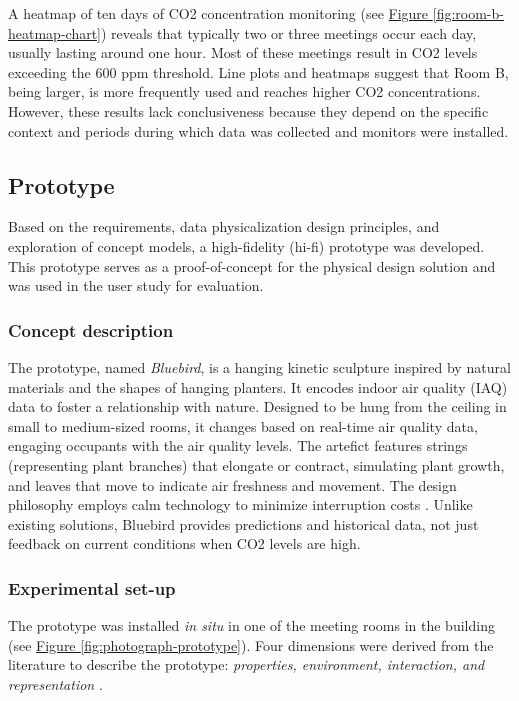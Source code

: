 A heatmap of ten days of CO2 concentration monitoring (see \hyperref[fig:room-b-heatmap-chart]{Figure \ref*{fig:room-b-heatmap-chart}}) reveals that typically two or three meetings occur each day, usually lasting around one hour. Most of these meetings result in CO2 levels exceeding the 600 ppm threshold. Line plots and heatmaps suggest that Room B, being larger, is more frequently used and reaches higher CO2 concentrations. However, these results lack conclusiveness because they depend on the specific context and periods during which data was collected and monitors were installed.


\subsection{Prototype}
\label{sec:prototype_results}

Based on the requirements, data physicalization design principles, and exploration of concept models, a high-fidelity (hi-fi) prototype was developed. This prototype serves as a proof-of-concept for the physical design solution and was used in the user study for evaluation.

\subsubsection{Concept description}

The prototype, named \textit{Bluebird}, is a hanging kinetic sculpture inspired by natural materials and the shapes of hanging planters. It encodes indoor air quality (IAQ) data to foster a relationship with nature. Designed to be hung from the ceiling in small to medium-sized rooms, it changes based on real-time air quality data, engaging occupants with the air quality levels. The artefict features strings (representing plant branches) that elongate or contract, simulating plant growth, and leaves that move to indicate air freshness and movement. The design philosophy employs calm technology to minimize interruption costs \cite{case_calm_2016}. Unlike existing solutions, Bluebird provides predictions and historical data, not just feedback on current conditions when CO2 levels are high.

\subsubsection{Experimental set-up}

The prototype was installed \textit{in situ} in one of the meeting rooms in the building (see \hyperref[fig:photograph-prototype]{Figure \ref*{fig:photograph-prototype}}). Four dimensions were derived from the literature to describe the prototype: \textit{properties, environment, interaction, and representation} \cite{sauve_physecology_2022, hornecker_design_2023, anhalt_university_germany_design_2022}.

